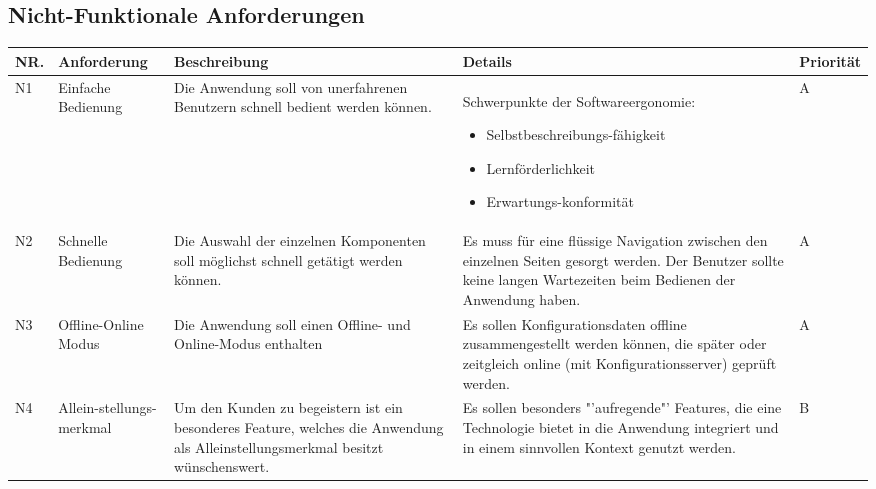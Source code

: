 \subsection{Nicht-Funktionale Anforderungen}
\begin{tabular}[H]{| p{0.5cm} | p{2.2cm} | p{4.5cm} | p{5.3cm} | p{1.3cm} |}
\toprule[2pt] \rowcolor{dunkelgrau}
\hline
  NR. & Anforderung & Beschreibung & Details & Priorität \\
  \hline
  N1 & Einfache \newline Bedienung & Die Anwendung soll von unerfahrenen Benutzern schnell bedient werden können.& Schwerpunkte der Softwareergonomie\cite{bib:softwareErgonomie}: 
  \begin{itemize}
        \item Selbstbeschreibungs-fähigkeit
        \item Lernförderlichkeit
        \item Erwartungs-konformität
     \end{itemize}
   & A \\
  \hline
  N2 & Schnelle Bedienung & Die Auswahl der einzelnen Komponenten soll möglichst schnell getätigt werden können. & Es muss für eine flüssige Navigation zwischen den einzelnen Seiten gesorgt werden. Der Benutzer sollte keine langen Wartezeiten beim Bedienen der Anwendung haben. & A \\
  \hline
    N3 & Offline-Online Modus & Die Anwendung soll einen Offline- und Online-Modus enthalten & Es sollen Konfigurationsdaten offline zusammengestellt werden können, die später oder zeitgleich online (mit Konfigurationsserver) geprüft werden. & A \\
    \hline
    N4 & Allein-stellungs-merkmal & Um den Kunden zu begeistern ist ein besonderes Feature, welches die Anwendung als Alleinstellungsmerkmal besitzt wünschenswert.& Es sollen besonders "'aufregende"' Features, die eine Technologie bietet in die Anwendung integriert und in einem sinnvollen Kontext genutzt werden.  & B\\
    \hline
\bottomrule[2pt]
\end{tabular}

